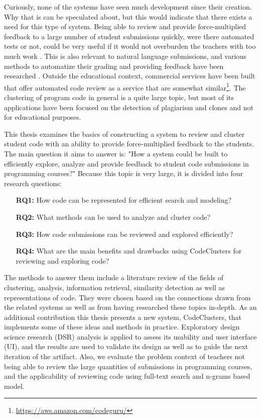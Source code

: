 Curiously, none of the systems have seen much development since their creation. Why that is can be speculated about, but this would indicate that there exists a need for this type of system. Being able to review and provide force-multiplied feedback to a large number of student submissions quickly, were there automated tests or not, could be very useful if it would not overburden the teachers with too much work \cite{aalto-2010-auto-ass-systems-review}. This is also relevant to natural language submissions, and various methods to automatize their grading and providing feedback have been researched \cite{auto-essay-scoring-case-studies, arxiv-auto-essay-grading-feedback-2018 ,divide-and-correct}. Outside the educational context, commercial services have been built that offer automated code review as a service that are somewhat similar\footnote{\url{https://aws.amazon.com/codeguru/}}. The clustering of program code in general is a quite large topic, but most of its applications have been focused on the detection of plagiarism and clones and not for educational purposes.

This thesis examines the basics of constructing a system to review and cluster student code with an ability to provide force-multiplied feedback to the students. The main question it aims to answer is: "How a system could be built to efficiently explore, analyze and provide feedback to student code submissions in programming courses?" Because this topic is very large, it is divided into four research questions:

\addtolength\leftmargini{6pt}
\begin{itemize}
    \item[\textbf{RQ1:}] How code can be represented for efficient search and modeling?
    \item[\textbf{RQ2:}] What methods can be used to analyze and cluster code?
    \item[\textbf{RQ3:}] How code submissions can be reviewed and explored efficiently?
    \item[\textbf{RQ4:}] What are the main benefits and drawbacks using CodeClusters for reviewing and exploring code?
\end{itemize}

The methods to answer them include a literature review of the fields of clustering, analysis, information retrieval, similarity detection as well as representations of code. They were chosen based on the connections drawn from the related systems as well as from having researched these topics in-depth. As an additional contribution this thesis presents a new system, CodeClusters, that implements some of these ideas and methods in practice. Exploratory design science research (DSR) analysis is applied to assess its usability and user interface (UI), and the results are used to validate its design as well as to guide the next iteration of the artifact. Also, we evaluate the problem context of teachers not being able to review the large quantities of submissions in programming courses, and the applicability of reviewing code using full-text search and n-grams based model.


